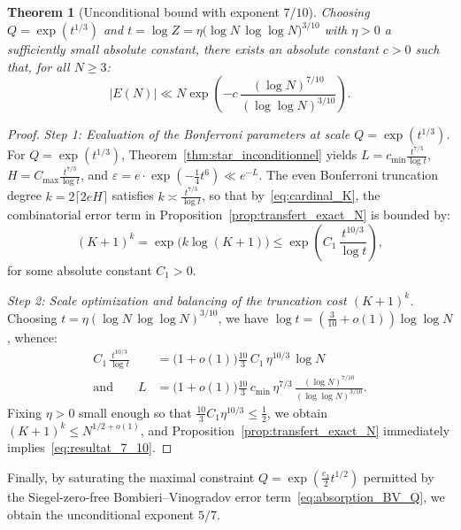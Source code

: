 \documentclass[11pt, a4paper]{article}
\theoremstyle{plain}
\newtheorem{theorem}{Theorem}[section]
\theoremstyle{definition}
\begin{document}
\begin{theorem}[Unconditional bound with exponent $7/10$]\label{thm:theoreme_7_10}
Choosing $Q = \exp(t^{1/3})$ and $t = \log Z = \eta\big(\log N\,\log\log N\big)^{3/10}$ with $\eta > 0$ a sufficiently small absolute constant, there exists an absolute constant $c > 0$ such that, for all $N \ge 3$:
\begin{equation}\label{eq:resultat_7_10}
|E(N)| \ll N \exp\!\left( -c\,\frac{(\log N)^{7/10}}{(\log\log N)^{3/10}} \right).
\end{equation}
\end{theorem}
\begin{proof}
\emph{Step 1: Evaluation of the Bonferroni parameters at scale $Q = \exp(t^{1/3})$.} For $Q = \exp(t^{1/3})$, Theorem~\ref{thm:star_inconditionnel} yields $L = c_{\min} \frac{t^{7/3}}{\log t}$, $H = C_{\max} \frac{t^{7/3}}{\log t}$, and $\varepsilon = e \cdot \exp(-\frac{1}{4} t^6) \ll e^{-L}$. The even Bonferroni truncation degree $k = 2\lceil 2eH \rceil$ satisfies $k \asymp \frac{t^{7/3}}{\log t}$, so that by~\eqref{eq:cardinal_K}, the combinatorial error term in Proposition~\ref{prop:transfert_exact_N} is bounded by:
\[
(K+1)^k = \exp\!\big(k \log(K+1)\big) \le \exp\!\left( C_1\,\frac{t^{10/3}}{\log t} \right),
\]
for some absolute constant $C_1 > 0$.

\medskip\noindent
\emph{Step 2: Scale optimization and balancing of the truncation cost $(K+1)^k$.} Choosing $t =\allowbreak \eta\allowbreak (\log N\allowbreak\,\log\log N)^{3/10}$, we have $\log t = \left(\frac{3}{10} + o(1)\right)\log\log N$, whence:
\[
\begin{aligned}
C_1\,\frac{t^{10/3}}{\log t} &= \big(1 + o(1)\big)\frac{10}{3}\,C_1\,\eta^{10/3}\,\log N \\
\text{and} \qquad L &= \big(1 + o(1)\big)\frac{10}{3}\,c_{\min}\,\eta^{7/3}\,\frac{(\log N)^{7/10}}{(\log\log N)^{3/10}}.
\end{aligned}
\]
Fixing $\eta > 0$ small enough so that $\frac{10}{3} C_1 \eta^{10/3} \le \frac{1}{2}$, we obtain $(K+1)^k \le N^{1/2+o(1)}$, and Proposition~\ref{prop:transfert_exact_N} immediately implies~\eqref{eq:resultat_7_10}.
\end{proof}

Finally, by saturating the maximal constraint $Q = \exp(\frac{c_3}{2} t^{1/2})$ permitted by the Siegel-zero-free Bombieri--Vinogradov error term~\eqref{eq:absorption_BV_Q}, we obtain the unconditional exponent $5/7$.
\end{document}
